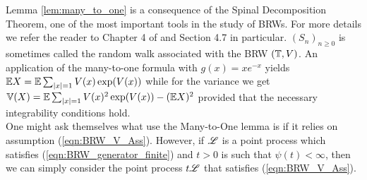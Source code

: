 Lemma \ref{lem:many_to_one} is a consequence of the Spinal Decomposition Theorem, one of the most important tools in the study of BRWs. For more details we refer the reader to Chapter 4 of \cite{shi2015branching} and Section 4.7 in particular. $(S_n)_{n\geq0}$ is sometimes called the random walk associated with the BRW $(\mathbb{T}, V)$. An application of the many-to-one formula with $g(x) = x e^{-x}$ yields $\mathbb{E} X = \mathbb{E} \sum_{|x|=1} V(x) \exp(V(x))$ while for the variance we get $\mathbb{V}(X) = \mathbb{E} \sum_{|x|=1} V(x)^2 \exp(V(x)) - (\mathbb{E} X)^2$ provided that the necessary integrability conditions hold. \\

One might ask themselves what use the Many-to-One lemma is if it relies on assumption (\ref{eqn:BRW_V_Ass}). However, if $\mathscr{L}$ is a point process which satisfies (\ref{eqn:BRW_generator_finite}) and $t > 0$ is such that $\psi(t) < \infty$, then we can simply consider the point process $t \mathscr{L}$ that satisfies (\ref{eqn:BRW_V_Ass}). 





